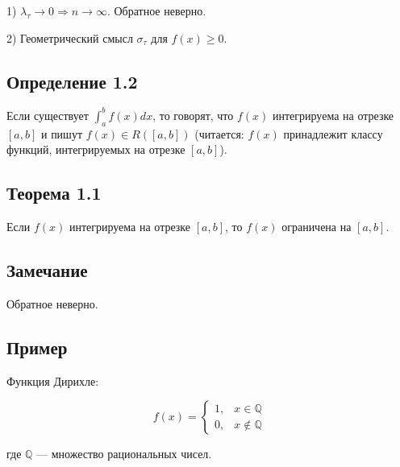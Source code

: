 {1) \( \lambda_\tau \to 0 \Rightarrow n \to \infty \). Обратное неверно.

2) Геометрический смысл \( \sigma_\tau \) для \( f(x) \geq 0 \).

\subsection*{Определение 1.2}

Если существует \( \int_a^b f(x)dx \), то говорят, что \( f(x) \) интегрируема на отрезке \( [a, b] \) и пишут \( f(x) \in R([a, b]) \) (читается: \( f(x) \) принадлежит классу функций, интегрируемых на отрезке \( [a, b] \)).

\subsection*{Теорема 1.1}

Если \( f(x) \) интегрируема на отрезке \( [a, b] \), то \( f(x) \) ограничена на \( [a, b] \).

\subsection*{Замечание}

Обратное неверно.

\subsection*{Пример}

Функция Дирихле:

\[
f(x) =
\begin{cases} 
1, & x \in \mathbb{Q} \\ 
0, & x \notin \mathbb{Q}
\end{cases}
\]

где \( \mathbb{Q} \) — множество рациональных чисел.
}